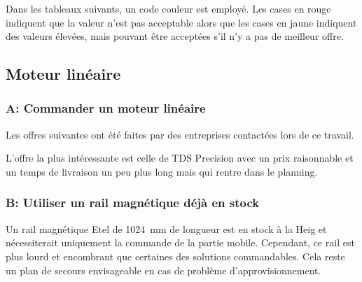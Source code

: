 Dans les tableaux suivants, un code couleur est employé. Les cases en rouge indiquent que la valeur n'est pas acceptable alors que les cases en jaune indiquent des valeurs élevées, mais pouvant être
acceptées s'il n'y a pas de meilleur offre.

\subsection{Moteur linéaire}
\subsubsection{A: Commander un moteur linéaire}
Les offres suivantes ont été faites par des entreprises contactées lors de ce travail.

\begin{table}[H]
  \centering
  \caption{Offres pour le moteur linéaire}
  \label{tab:OffreMot}
\end{table}

L'offre la plus intéressante est celle de TDS Precision \cite{TDSPrecisionProducts} avec un prix raisonnable et un temps de livraison un peu plus long mais qui rentre dans le planning.

\subsubsection{B: Utiliser un rail magnétique déjà en stock}
Un rail magnétique Etel \cite{Etel} de 1024~mm de longueur est en stock à la \acrshort{Heig} et nécessiterait uniquement la commande de la partie mobile. Cependant, ce
rail est plus lourd et encombrant que certaines des solutions commandables. Cela reste un plan de secours envisageable en cas de problème d'approvisionnement.

